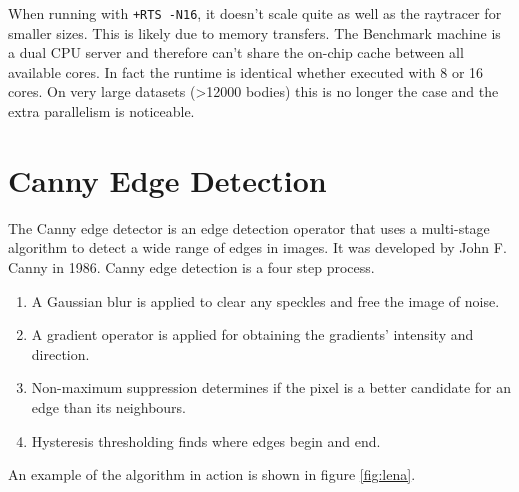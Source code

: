 \documentclass[a4paper,bibliography=totocnumbered,parskip,headsepline]{scrbook}
\begin{document}
When running with \texttt{+RTS -N16}, it doesn't scale quite as well as the raytracer for smaller sizes.
This is likely due to memory transfers.
The Benchmark machine is a dual CPU server and therefore can't share the on-chip cache between all available cores.
In fact the runtime is identical whether executed with 8 or 16 cores.
On very large datasets (>12000 bodies) this is no longer the case and the extra parallelism is noticeable.

\section{Canny Edge Detection}
The Canny edge detector is an edge detection operator that uses a multi-stage algorithm to detect a wide range of edges in images.
It was developed by John F. Canny in 1986.
Canny edge detection is a four step process.
\begin{enumerate}[noitemsep]
\item A Gaussian blur is applied to clear any speckles and free the image of noise.
\item A gradient operator is applied for obtaining the gradients' intensity and direction.
\item Non-maximum suppression determines if the pixel is a better candidate for an edge than its neighbours.
\item Hysteresis thresholding finds where edges begin and end.
\end{enumerate}

An example of the algorithm in action is shown in figure \ref{fig:lena}.
\end{document}
